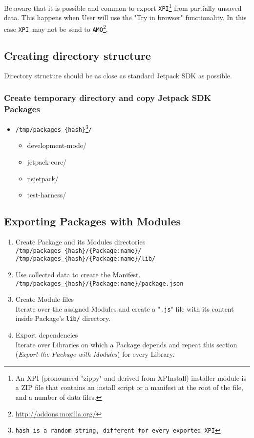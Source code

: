 \documentclass[10pt]{article}
\def\xpi{{\tt XPI}}
\def\amo{{\tt AMO}}
\begin{document}
	Be aware that it is possible and common to export \xpi\footnote{An XPI (pronounced "zippy" and derived 
	from XPInstall) installer module is a ZIP file that contains an install script or a manifest at the root 
	of the file, and a number of data files.} from partially unsaved data. This happens when User will use 
	the "Try in browser" 	functionality. In this case \xpi\ may not be send to 
	\amo\footnote{\url{http://addons.mozilla.org/}}.
	
	\subsection{Creating directory structure}
		
		Directory structure should be as close as standard Jetpack SDK as possible. 
		
		\subsubsection*{Create temporary directory and copy Jetpack SDK Packages}
		
		\begin{itemize}
			\item{\tt /tmp/packages\_\{hash\}\footnote{hash is a random string, different for every 
			exported \xpi}/
				\begin{itemize}
					\item{development-mode/}
					\item{jetpack-core/}
					\item{nsjetpack/}
					\item{test-harness/}
				\end{itemize}
			}
		\end{itemize}
	
	\subsection{Exporting Packages with Modules}
		
		\begin{enumerate}
			\item{Create Package and its Modules directories\\
				{\tt /tmp/packages\_\{hash\}/\{Package:name\}/}\\
				{\tt /tmp/packages\_\{hash\}/\{Package:name\}/lib/}
			}
			\item{Use collected data to create the Manifest.\\
				{\tt /tmp/packages\_\{hash\}/\{Package:name\}/package.json}
			}
			\item{Create Module files\\
				Iterate over the assigned Modules and create a "{\tt .js}" file with its content inside 
				Package's {\tt lib/} directory.
			}
			\item{Export dependencies\\
				Iterate over Libraries on which a Package depends and repeat this section ({\em Export 
				the Package with Modules}) for every Library.
			}
		\end{enumerate}
	
\end{document}
